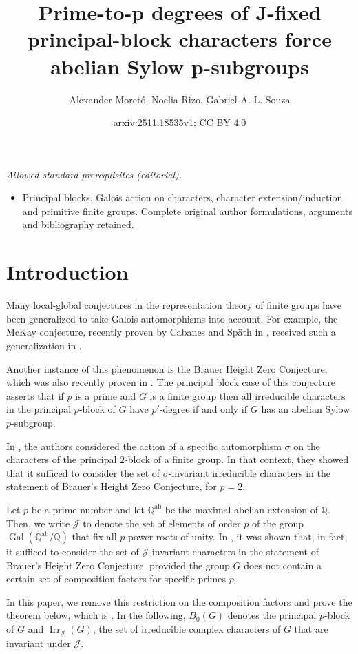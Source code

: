 \documentclass[12pt]{amsart}
\title{Prime-to-p degrees of J-fixed principal-block characters force abelian Sylow p-subgroups}
\author{Alexander Moretó, Noelia Rizo, Gabriel A. L. Souza}
\date{arxiv:2511.18535v1; CC BY 4.0}
\theoremstyle{theorem}
\theoremstyle{definition}
\newcommand{\Irr}{{\operatorname{Irr}}}
\begin{document}
\maketitle
\noindent\textit{Allowed standard prerequisites (editorial).}\begin{itemize}
\item Principal blocks, Galois action on characters, character extension/induction and primitive finite groups. Complete original author formulations, arguments and bibliography retained.
\end{itemize}\medskip
	\section{Introduction}
	
	Many local-global conjectures in the representation theory of finite groups have been generalized to take Galois automorphisms into account. For example, the McKay conjecture, recently proven by Cabanes and Späth in \cite{McKay}, received such a generalization in \cite{Galois-McKay}.
	
	Another instance of this phenomenon is the Brauer Height Zero Conjecture, which was also recently proven in \cite{BHZ}. The principal block case of this conjecture asserts that if $p$ is a prime and $G$ is a finite group then all irreducible characters in the principal $p$-block of $G$ have $p'$-degree if and only if $G$ has an abelian Sylow $p$-subgroup. 
	
	 In \cite{MN}, the authors considered the action of a specific automorphism $\sigma$ on the characters of the principal $2$-block of a finite group. In that context, they showed that it sufficed to consider the set of $\sigma$-invariant irreducible characters in the statement of Brauer's Height Zero Conjecture, for $p = 2$.
	 
	 Let $p$ be a prime number and let $\mathbb{Q}^{\operatorname{ab}}$ be the maximal abelian extension of $\mathbb{Q}$. Then, we write $\mathcal{J}$ to denote the set of elements of order $p$ of the group $\operatorname{Gal}(\mathbb{Q}^{\operatorname{ab}}/\mathbb{Q})$ that fix all $p$-power roots of unity. In \cite{MMRSF}, it was shown that, in fact, it sufficed to consider the set of $\mathcal{J}$-invariant characters in the statement of Brauer's Height Zero Conjecture, provided the group $G$ does not contain a certain set of composition factors for specific primes $p$.
	
	In this paper, we remove this restriction on the composition factors and prove the theorem below, which is \cite[Conjecture 1]{MMRSF}. In the following, $B_0(G)$ denotes the principal $p$-block of $G$ and $\Irr_{\mathcal{J}}(G)$, the set of irreducible complex characters of $G$ that are invariant under $\mathcal{J}$.
	
\end{document}
